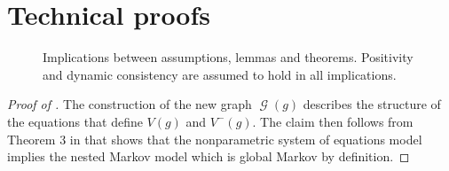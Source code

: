 \documentclass[12pt,a4paper]{article}
\theoremstyle{definition}
\DeclareMathOperator{\gG}{\mathscr{G}}
\begin{document}
\section{Technical proofs}\label{sec:technical-proofs}

\begin{figure}[h!]
  \centering
  \vspace{1ex}
  \caption{Implications between assumptions, lemmas and theorems. Positivity and dynamic consistency are assumed to hold in all implications.}
  \label{fig:assump_implications}
\end{figure}

\begin{proof}[Proof of ]
  The construction of the new graph $\gG(g)$ describes the structure
  of the equations that define $V(g)$ and $V^-(g)$. The claim then
  follows from Theorem 3 in \textcite{zhao_admgs_2024} that shows that the
  nonparametric system of equations model implies the nested
  Markov model \parencite{richardson_nested_2023} which is global
  Markov by definition.
\end{proof}
\end{document}
